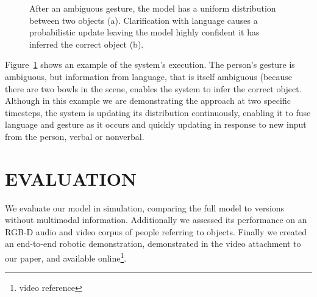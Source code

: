 \documentclass[letterpaper, 10 pt, conference]{ieeeconf}
\begin{document}
\begin{figure}
\centering
{}
\caption{After an ambiguous gesture, the model has a uniform
  distribution between two objects (a).  Clarification with language
  causes a probabilistic update leaving the model highly confident it
  has inferred the correct object (b). \label{fig:cartoon}}
\end{figure}

Figure~\ref{fig:cartoon} shows an example of the system's execution.
The person's gesture is ambiguous, but information from language, that
is itself ambiguous (because there are two bowls in the scene, enables
the system to infer the correct object.  Although in this example we
are demonstrating the approach at two specific timesteps, the system
is updating its distribution continuously, enabling it to fuse
language and gesture as it occurs and quickly updating in response to
new input from the person, verbal or nonverbal.

\section{EVALUATION}

We evaluate our model in simulation, comparing the full model to
versions without multimodal information.  Additionally we assessed its
performance on an RGB-D audio and video corpus of people referring to
objects.  Finally we created an end-to-end robotic demonstration,
demonstrated in the video attachment to our paper, and available
online\footnote{video reference}. 
\end{document}
